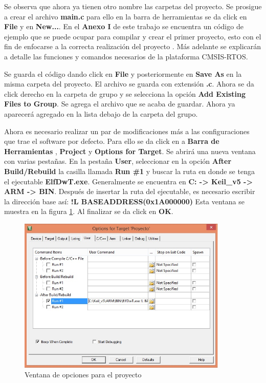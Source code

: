 \documentclass[12pt, twoside]{report}
\begin{document}
Se observa que ahora ya tienen otro nombre las carpetas del proyecto. Se prosigue a crear el archivo \textbf{main.c} para ello en la barra de herramientas se da click en \textbf{File} y en \textbf{New...}. En el \textbf{Anexo I} de este trabajo se encuentra un código de ejemplo que se puede ocupar para compilar y crear el primer proyecto, esto con el fin de enfocarse a la correcta realización del proyecto . Más adelante se explicarán a detalle las funciones y comandos necesarios de la plataforma CMSIS-RTOS.

Se guarda el código dando click en \textbf{File} y posteriormente en \textbf{Save As} en la misma carpeta del proyecto. El archivo se guarda con extensión \textbf{.c}. Ahora se da click derecho en la carpeta de grupo y se selecciona la opción \textbf{Add Existing Files to Group}. Se agrega el archivo que se acaba de guardar. Ahora ya aparecerá agregado en la lista debajo de la carpeta del grupo. 

Ahora es necesario realizar un par de modificaciones más a las configuraciones que trae el software por defecto. Para ello se da click en a \textbf{Barra de Herramientas} , \textbf{Project} y \textbf{Options for Target}. Se abrirá una nueva ventana con varias pestañas. En la pestaña \textbf{User}, seleccionar en la opción\textbf{ After Build/Rebuild} la casilla llamada \textbf{Run \#1} y buscar la ruta en donde se tenga el ejecutable \textbf{ElfDwT.exe}. Generalmente se encuentra en \textbf{C: -> Keil\_v5 -> ARM -> BIN}. Después de insertar la ruta del ejecutable, es necesario escribir la dirección base así: \textbf{!L BASEADDRESS(0x1A000000)} Esta ventana se muestra en la figura \ref{cap1:005}. Al finalizar se da click en \textbf{OK}.

\begin{figure}[H]
	\centering
	\includegraphics[width=100mm]{opctarget}
	\caption{Ventana de opciones para el proyecto }
	\label{cap1:005}
\end{figure}
\end{document}
